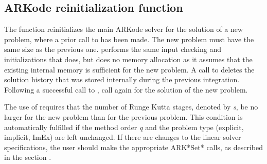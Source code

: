 \documentclass[letterpaper,10pt,english]{sphinxmanual}
\begin{document}
\subsection{ARKode reinitialization function}
\label{c_interface/User_callable:cinterface-reinitialization}\label{c_interface/User_callable:arkode-reinitialization-function}
The function {\hyperref[c_interface/User_callable:c.ARKodeReInit]{\emph{}}} reinitializes the main ARKode
solver for the solution of a new problem, where a prior call to
{\hyperref[c_interface/User_callable:c.ARKodeInit]{\emph{}}} has been made. The new problem must have the
same size as the previous one.  {\hyperref[c_interface/User_callable:c.ARKodeReInit]{\emph{}}} performs the
same input checking and initializations that {\hyperref[c_interface/User_callable:c.ARKodeInit]{\emph{}}}
does, but does no memory allocation as it assumes that the existing
internal memory is sufficient for the new problem.  A call to
{\hyperref[c_interface/User_callable:c.ARKodeReInit]{\emph{}}} deletes the solution history that was stored
internally during the previous integration.  Following a successful
call to {\hyperref[c_interface/User_callable:c.ARKodeReInit]{\emph{}}}, call {\hyperref[c_interface/User_callable:c.ARKode]{\emph{}}} again for
the solution of the new problem.

The use of {\hyperref[c_interface/User_callable:c.ARKodeReInit]{\emph{}}} requires that the number of Runge
Kutta stages, denoted by \emph{s}, be no larger for the new problem than
for the previous problem.  This condition is automatically fulfilled
if the method order \emph{q} and the problem type (explicit, implicit,
ImEx) are left unchanged.  If there are changes to the linear solver
specifications, the user should make the appropriate ARK*Set* calls,
as described in the section {\hyperref[c_interface/User_callable:cinterface-linearsolvers]{\emph{}}}.
\end{document}
